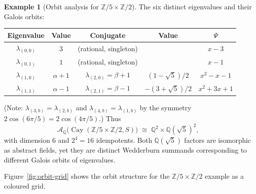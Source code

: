 \documentclass[12pt]{amsart}
\numberwithin{equation}{section}
\theoremstyle{plain}
\theoremstyle{definition}
\newtheorem{example}[theorem]{Example}
\DeclareMathOperator{\Cay}{Cay}
\newcommand{\Z}{\mathbb{Z}}
\newcommand{\Q}{\mathbb{Q}}
\newcommand{\calA}{\mathcal{A}}
\begin{document}
\begin{example}[Orbit analysis for $\Z/5 \times \Z/2$]
\label{ex:Z5Z2}
The six distinct eigenvalues and their Galois orbits:
\begin{center}
\renewcommand{\arraystretch}{1.10}
\footnotesize
\begin{tabular}{cc|cc|c}
\toprule
Eigenvalue & Value & Conjugate & Value & $\Psi$ \\
\midrule
$\lambda_{(0,0)}$ & $3$ & (rational, singleton) & & $x-3$ \\
$\lambda_{(0,1)}$ & $1$ & (rational, singleton) & & $x-1$ \\
$\lambda_{(1,0)}$ & $\alpha+1$ & $\lambda_{(2,0)} = \beta+1$ & $(1-\sqrt{5})/2$ & $x^2-x-1$ \\
$\lambda_{(1,1)}$ & $\alpha-1$ & $\lambda_{(2,1)} = \beta-1$ & $-(3+\sqrt{5})/2$ & $x^2+3x+1$ \\
\bottomrule
\end{tabular}
\end{center}
(Note: $\lambda_{(3,b)} = \lambda_{(2,b)}$ and $\lambda_{(4,b)} = \lambda_{(1,b)}$
by the symmetry $2\cos(6\pi/5) = 2\cos(4\pi/5)$.)  Thus
\[
  \calA_\Q\!\bigl(\Cay(\Z/5 \times \Z/2, S)\bigr)
  \;\cong\; \Q^2 \times \Q(\sqrt{5})^2,
\]
with dimension $6$ and $2^4 = 16$ idempotents.  Both $\Q(\sqrt{5})$ factors
are isomorphic as abstract fields, yet they are distinct Wedderburn summands
corresponding to different Galois orbits of eigenvalues.
\end{example}

Figure~\ref{fig:orbit-grid} shows the orbit structure for the
$\Z/5 \times \Z/2$ example as a coloured grid.
\end{document}
